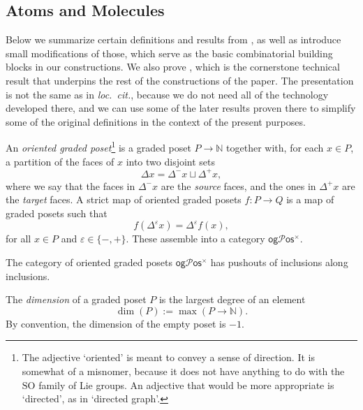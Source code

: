 \documentclass[12pt,a4paper]{article}
\numberwithin{equation}{section}
\newcommand{\ogpos}{\mathsf{og} \mathscr{P} \mathsf{os}^{\times}}
\begin{document}
\subsection{Atoms and Molecules}\label{ssec:atoms_molecules}

Below we summarize certain definitions and results from \cite{hadzihasanovic}, as well as introduce small modifications of those, which serve as the basic combinatorial building blocks in our constructions. We also prove , which is the cornerstone technical result that underpins the rest of the constructions of the paper. The presentation is not the same as in \textit{loc.~cit.}, because we do not need all of the technology developed there, and we can use some of the later results proven there to simplify some of the original definitions in the context of the present purposes.


\begin{definition}
    An \emph{oriented graded poset}\footnote{The adjective `oriented' is meant to convey a sense of direction. It is somewhat of a misnomer, because it does not have anything to do with the $\mathrm{SO}$ family of Lie groups. An adjective that would be more appropriate is `directed', as in `directed graph'.} is a graded poset $P \to \mathbb{N}$ together with, for each $x \in P$, a partition of the faces of $x$ into two disjoint sets
    \begin{equation}
        \Delta x = \Delta^- x \sqcup \Delta^+ x,
    \end{equation}
    where we say that the faces in $\Delta^- x$ are the \emph{source} faces, and the ones in $\Delta^+ x$ are the \emph{target} faces. A strict map of oriented graded posets $f: P \to Q$ is a map of graded posets such that
    \begin{equation}
        f(\Delta^\varepsilon x) = \Delta^\varepsilon f(x),
    \end{equation}
    for all $x \in P$ and $\varepsilon \in \{ -, + \}$. These assemble into a category $\ogpos$.
\end{definition}

\begin{lemma}
    The category of oriented graded posets $\ogpos$ has pushouts of inclusions along inclusions.
\end{lemma}

\begin{definition}\label{def:dimension}
    The \emph{dimension} of a graded poset $P$ is the largest degree of an element
    \begin{equation}
        \dim(P) := \max (P \to \mathbb{N}).
    \end{equation}
    By convention, the dimension of the empty poset is $-1$. 
\end{definition}
\end{document}
